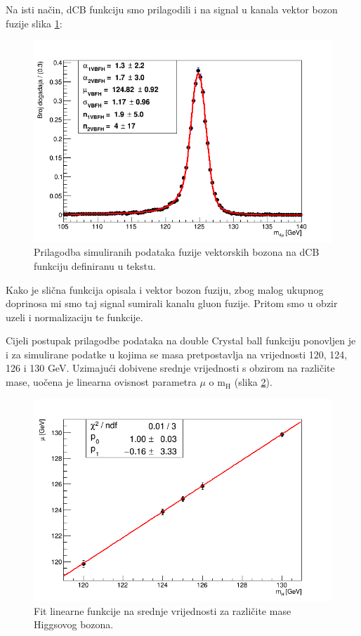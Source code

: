 \documentclass[12pt,a4paper,oneside]{article}
\begin{document}
\begin{linenumbers}
		Na isti način, dCB funkciju smo prilagodili i na signal u kanala vektor bozon fuzije slika \ref{sl:dcbfit-vbfh}:		
		\begin{figure}[H]
			\centering
			\includegraphics[width=1.0\textwidth]{signal-vbfh-weighted1.png}
			\caption[Prilagodba simuliranih podataka fuzije vektorskih bozona na dCB funkciju definiranu u tekstu.]{\label{sl:dcbfit-vbfh} Prilagodba simuliranih podataka fuzije vektorskih bozona na dCB funkciju definiranu u tekstu.}
		\end{figure}
		Kako je slična funkcija opisala i vektor bozon fuziju, zbog malog ukupnog doprinosa mi smo taj signal sumirali kanalu gluon fuzije. Pritom smo u obzir uzeli i normalizaciju te funkcije.
	
		Cijeli postupak prilagodbe podataka na double Crystal ball funkciju ponovljen je i za simulirane podatke u kojima se masa pretpostavlja na vrijednosti 120, 124, 126 i 130 GeV. Uzimajući dobivene srednje vrijednosti s obzirom na različite mase, uočena je linearna ovisnost parametra $\mu$ o m$_{\mathrm{H}}$ (slika \ref{sl:sl5}).
		
		 
		\begin{figure}[H]
			\centering
			\includegraphics[width=1.0\textwidth]{fit-mH-19-8.png}
			\caption[Fit linearne funkcije na srednje vrijednosti za različite mase Higgsovog bozona.]{\label{sl:sl5} Fit linearne funkcije na srednje vrijednosti za različite mase Higgsovog bozona.}
		\end{figure}
	

\end{linenumbers}
\end{document}
